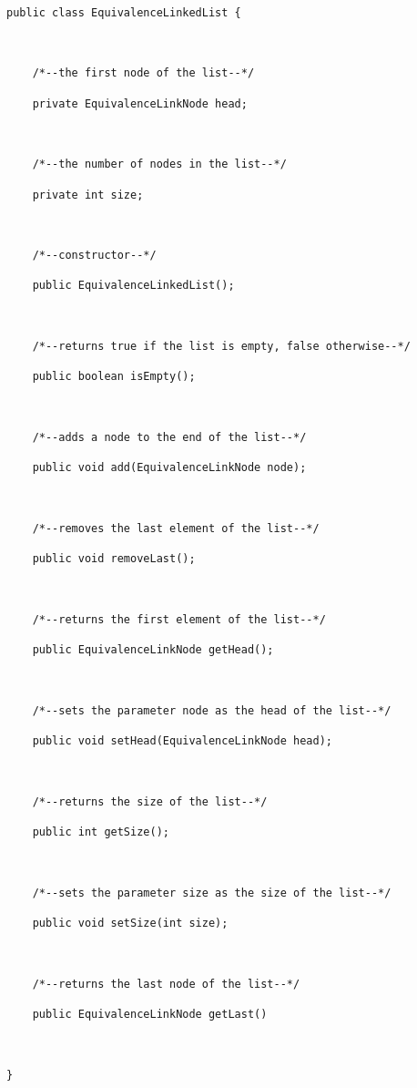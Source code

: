 \documentclass{report}
\begin{document}
\begin{lstlisting}[caption=Methods and fields in the Linked List class, label=find]

public class EquivalenceLinkedList {

	

	/*--the first node of the list--*/

	private EquivalenceLinkNode head;



	/*--the number of nodes in the list--*/

	private int size;



	/*--constructor--*/

	public EquivalenceLinkedList();



	/*--returns true if the list is empty, false otherwise--*/	

	public boolean isEmpty();



	/*--adds a node to the end of the list--*/

	public void add(EquivalenceLinkNode node);

	

	/*--removes the last element of the list--*/

	public void removeLast();



	/*--returns the first element of the list--*/

	public EquivalenceLinkNode getHead();



	/*--sets the parameter node as the head of the list--*/

	public void setHead(EquivalenceLinkNode head);



	/*--returns the size of the list--*/	

	public int getSize();



	/*--sets the parameter size as the size of the list--*/	

	public void setSize(int size);



	/*--returns the last node of the list--*/

	public EquivalenceLinkNode getLast()



}

\end{lstlisting}
\end{document}
